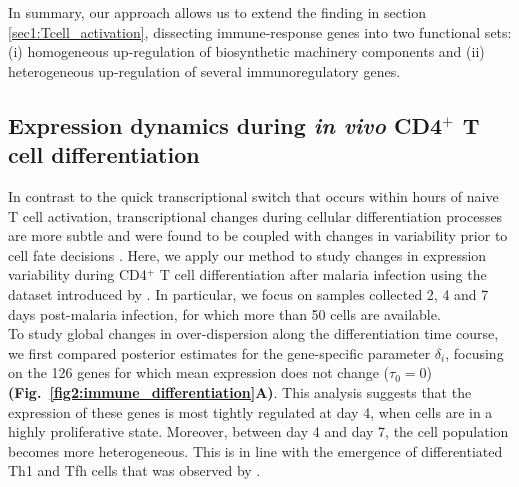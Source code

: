 In summary, our approach allows us to extend the finding in section \ref{sec1:Tcell_activation}, dissecting immune-response genes into two functional sets: (i) homogeneous up-regulation of biosynthetic machinery components and (ii) heterogeneous up-regulation of several immunoregulatory genes.

\subsection{Expression dynamics during \textit{in vivo} CD4$^+$ T cell differentiation}

In contrast to the quick transcriptional switch that occurs within hours of naive T cell activation, transcriptional changes during cellular differentiation processes are more subtle and were found to be coupled with changes in variability prior to cell fate decisions \citep{Richard2016, Mojtahedi2016}. Here, we apply our method to study changes in expression variability during CD4$^+$ T cell differentiation after malaria infection using the dataset introduced by \cite{Lonnberg2017}. In particular, we focus on samples collected 2, 4 and 7 days post-malaria infection, for which more than 50 cells are available.\\

To study global changes in over-dispersion along the differentiation time course, we first compared posterior estimates for the gene-specific parameter $\delta_i$, focusing on the 126 genes for which mean expression does not change ($\tau_0 = 0$) \textbf{(Fig.~\ref{fig2:immune_differentiation}A)}. This analysis suggests that the expression of these genes is most tightly regulated at day 4, when cells are in a highly proliferative state. Moreover, between day 4 and day 7, the cell population becomes more heterogeneous. This is in line with the emergence of differentiated Th1 and Tfh cells that was observed by \cite{Lonnberg2017}. \\

